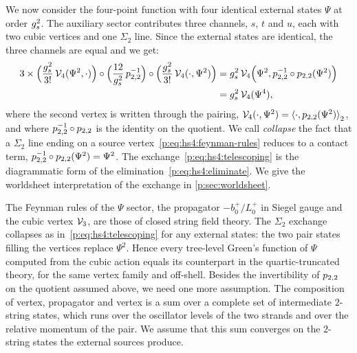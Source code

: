 
We now consider the four-point function with four identical external states $\Psi$ at order $\gs^2$.
The auxiliary sector contributes three channels, $s$, $t$ and $u$, each with two cubic vertices and one $\Sigma_2$ line.
Since the external states are identical, the three channels are equal and we get:
\begin{equation}
  \label{p:eq:hs4:telescoping}
  \begin{aligned}
    3 \times
    \Big( \frac{\gs^2}{3!} \, \vertex{4}(\Psi^2, \cdot) \Big)
    \circ
    \Big( \frac{12}{\gs^2} \, \sprod{2}{2}^{-1} \Big)
    \circ
    \Big( \frac{\gs^2}{3!} \, \vertex{4}(\cdot, \Psi^2) \Big)
      &
      = \gs^2 \, \vertex{4}\Big( \Psi^2, \sprod{2}{2}^{-1} \circ \sprod{2}{2}(\Psi^2) \Big)
      \\ &
      = \gs^2 \, \vertex{4}(\Psi^4),
  \end{aligned}
\end{equation}
where the second vertex is written through the pairing, $\vertex{4}(\cdot, \Psi^2) = \pair[2]{\cdot}{\sprod{2}{2}(\Psi^2)}$, and where $\sprod{2}{2}^{-1} \circ \sprod{2}{2}$ is the identity on the quotient.
We call \emph{collapse} the fact that a $\Sigma_2$ line ending on a source vertex~\eqref{p:eq:hs4:feynman-rules} reduces to a contact term, $\sprod{2}{2}^{-1} \circ \sprod{2}{2}(\Psi^2) = \Psi^2$.
The exchange~\eqref{p:eq:hs4:telescoping} is the diagrammatic form of the elimination~\eqref{p:eq:hs4:eliminate}.
We give the worldsheet interpretation of the exchange in \cref{p:sec:worldsheet}.

The Feynman rules of the $\Psi$ sector, the propagator $- b_0^+ / L_0^+$ in Siegel gauge and the cubic vertex $\vertex{3}$, are those of closed string field theory.
The $\Sigma_2$ exchange collapses as in~\eqref{p:eq:hs4:telescoping} for any external states: the two pair states filling the vertices replace $\Psi^2$.
Hence every tree-level Green's function of $\Psi$ computed from the cubic action equals its counterpart in the quartic-truncated theory, for the same vertex family and off-shell.
Besides the invertibility of $\sprod{2}{2}$ on the quotient assumed above, we need one more assumption.
The composition of vertex, propagator and vertex is a sum over a complete set of intermediate $2$-string states, which runs over the oscillator levels of the two strands and over the relative momentum of the pair.
We assume that this sum converges on the $2$-string states the external sources produce.
